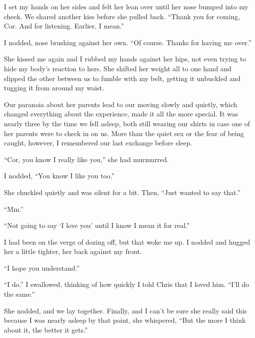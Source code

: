 I set my hands on her sides and felt her lean over until her nose bumped into my cheek.  We shared another kiss before she pulled back.  ``Thank you for coming, Cor.  And for listening.  Earlier, I mean.''

I nodded, nose brushing against her own.  ``Of course.  Thanks for having me over.''

She kissed me again and I rubbed my hands against her hips, not even trying to hide my body's reaction to hers.  She shifted her weight all to one hand and slipped the other between us to fumble with my belt, getting it unbuckled and tugging it from around my waist.

Our paranoia about her parents lead to our moving slowly and quietly, which changed everything about the experience, made it all the more special.  It was nearly three by the time we fell asleep, both still wearing our shirts in case one of her parents were to check in on us.  More than the quiet sex or the fear of being caught, however, I remembered our last exchange before sleep.

``Cor, you know I really like you,'' she had murmurred.

I nodded, ``You know I like you too.''

She chuckled quietly and was silent for a bit.  Then, ``Just wanted to say that.''

``Mm.''

``Not going to say `I love you' until I know I mean it for real.''

I had been on the verge of dozing off, but that woke me up.  I nodded and hugged her a little tighter, her back against my front.

``I hope you understand.''

``I do.''  I swallowed, thinking of how quickly I told Chris that I loved him.  ``I'll do the same.''

She nodded, and we lay together.  Finally, and I can't be sure she really said this because I was nearly asleep by that point, she whispered, ``But the more I think about it, the better it gets.''

